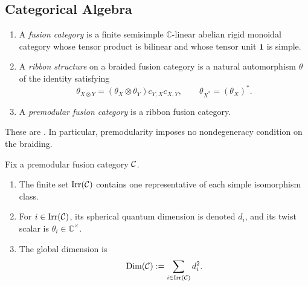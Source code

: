 \subsection{Categorical Algebra}
\label{subsec:fusion-categories}

\begin{definition}
\label{def:premodular-category}
\begin{enumerate}[label=(\roman*),ref=\roman*]
  \item\label{item:fusion-category}
  A \emph{fusion category} is a finite semisimple $\mathbb C$-linear abelian
  rigid monoidal category whose tensor product is bilinear and whose tensor
  unit $\mathbf 1$ is simple.

  \item\label{item:ribbon-structure}
  A \emph{ribbon structure} on a braided fusion category is a natural
  automorphism $\theta$ of the identity satisfying
  \[
    \theta_{X\otimes Y}
    =(\theta_X\otimes\theta_Y)c_{Y,X}c_{X,Y},
    \qquad
    \theta_{X^*}=(\theta_X)^*.
  \]

  \item\label{item:premodular-category}
  A \emph{premodular fusion category} is a ribbon fusion category.
\end{enumerate}
\end{definition}

\begin{remark}
\label{rem:premodular-category-reference}
These are \cite[Definitions~4.1.1, 8.10.1, and 8.13.1]{EGNO2015}.
In particular, premodularity imposes no nondegeneracy condition on the
braiding.
\end{remark}

\begin{convention}
\label{conv:simple-object-data}
Fix a premodular fusion category $\mathcal{C}$.
\begin{enumerate}[label=(\roman*),ref=\roman*]
  \item\label{item:simple-skeleton}
  The finite set $\operatorname{Irr}(\mathcal{C})$ contains one representative of
  each simple isomorphism class.

  \item\label{item:quantum-dimension}
  For $i\in\operatorname{Irr}(\mathcal{C})$, its spherical quantum dimension is
  denoted $d_i$, and its twist scalar is
  $\theta_i\in\mathbb C^\times$.

  \item\label{item:global-dimension}
  The global dimension is
  \[
    \operatorname{Dim}(\mathcal{C})
    :=\sum_{i\in\operatorname{Irr}(\mathcal{C})}d_i^2.
  \]
\end{enumerate}
\end{convention}

